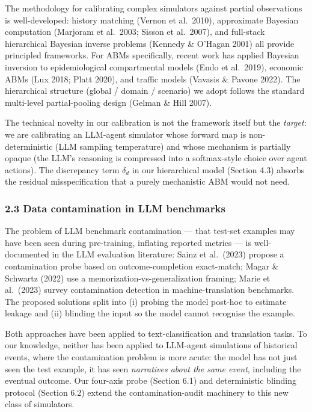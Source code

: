 \documentclass[
]{article}
\begin{document}
The methodology for calibrating complex simulators against partial
observations is well-developed: history matching (Vernon et al.~2010),
approximate Bayesian computation (Marjoram et al.~2003; Sisson et
al.~2007), and full-stack hierarchical Bayesian inverse problems
(Kennedy \& O'Hagan 2001) all provide principled frameworks. For ABMs
specifically, recent work has applied Bayesian inversion to
epidemiological compartmental models (Endo et al.~2019), economic ABMs
(Lux 2018; Platt 2020), and traffic models (Vavasis \& Pavone 2022). The
hierarchical structure (global / domain / scenario) we adopt follows the
standard multi-level partial-pooling design (Gelman \& Hill 2007).

The technical novelty in our calibration is not the framework itself but
the \emph{target}: we are calibrating an LLM-agent simulator whose
forward map is non-deterministic (LLM sampling temperature) and whose
mechanism is partially opaque (the LLM's reasoning is compressed into a
softmax-style choice over agent actions). The discrepancy term
\(\delta_d\) in our hierarchical model (Section 4.3) absorbs the
residual misspecification that a purely mechanistic ABM would not need.

\subsubsection{2.3 Data contamination in LLM
benchmarks}\label{data-contamination-in-llm-benchmarks}

The problem of LLM benchmark contamination --- that test-set examples
may have been seen during pre-training, inflating reported metrics ---
is well-documented in the LLM evaluation literature: Sainz et al.~(2023)
propose a contamination probe based on outcome-completion exact-match;
Magar \& Schwartz (2022) use a memorization-vs-generalization framing;
Marie et al.~(2023) survey contamination detection in
machine-translation benchmarks. The proposed solutions split into (i)
probing the model post-hoc to estimate leakage and (ii) blinding the
input so the model cannot recognise the example.

Both approaches have been applied to text-classification and translation
tasks. To our knowledge, neither has been applied to LLM-agent
simulations of historical events, where the contamination problem is
more acute: the model has not just seen the test example, it has seen
\emph{narratives about the same event}, including the eventual outcome.
Our four-axis probe (Section 6.1) and deterministic blinding protocol
(Section 6.2) extend the contamination-audit machinery to this new class
of simulators.
\end{document}
